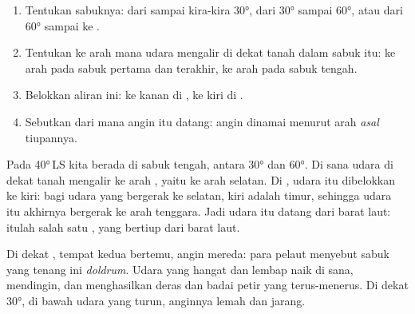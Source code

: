 \begin{method}\label{met:g8:winds-global-circulation:wind}
\begin{enumerate}
  \item Tentukan sabuknya: dari  sampai kira-kira \ang{30},
        dari \ang{30} sampai \ang{60}, atau dari \ang{60} sampai ke .
  \item Tentukan ke arah mana udara mengalir di dekat tanah dalam sabuk
        itu: ke arah  pada sabuk pertama dan terakhir, ke arah
         pada sabuk tengah.
  \item Belokkan aliran ini: ke kanan di , ke kiri di
        .
  \item Sebutkan dari mana angin itu datang: angin dinamai menurut arah
        \emph{asal} tiupannya.
\end{enumerate}
\end{method}

\begin{example}\label{ex:g8:winds-global-circulation:40s}
Pada \ang{40}\,LS kita berada di sabuk tengah, antara \ang{30} dan
\ang{60}. Di sana udara di dekat tanah mengalir ke arah , yaitu ke
arah selatan. Di , udara itu dibelokkan ke kiri: bagi
udara yang bergerak ke selatan, kiri adalah timur, sehingga udara itu
akhirnya bergerak ke arah tenggara. Jadi udara itu datang dari barat laut:
itulah salah satu , yang bertiup dari barat laut.
\end{example}

Di dekat , tempat  kedua  bertemu,
angin mereda: para pelaut menyebut sabuk yang tenang ini
\emph{doldrum}. Udara yang hangat dan lembap naik di sana, mendingin, dan
menghasilkan  deras dan badai petir yang terus-menerus. Di dekat
\ang{30}, di bawah udara yang turun, anginnya lemah dan  jarang.

